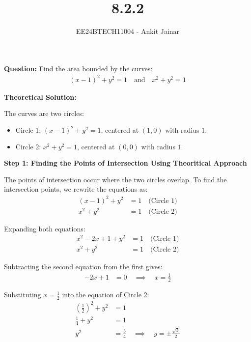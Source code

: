\documentclass[journal]{IEEEtran}
\title{8.2.2}
\author{EE24BTECH11004 - Ankit Jainar}
\date{}
\begin{document}

\vspace{3cm}

\maketitle

\bigskip

\textbf{Question:}
Find the area bounded by the curves:
\begin{align}
    (x - 1)^2 + y^2 = 1 \quad \text{and} \quad x^2 + y^2 = 1
\end{align}
\newline

\textbf{Theoretical Solution:}

The curves are two circles:
\begin{itemize}
    \item Circle 1: $(x - 1)^2 + y^2 = 1$, centered at $(1, 0)$ with radius $1$.
    \item Circle 2: $x^2 + y^2 = 1$, centered at $(0, 0)$ with radius $1$.
\end{itemize}

\textbf{Step 1: Finding the Points of Intersection Using Theoritical Approach}

The points of intersection occur where the two circles overlap. To find the intersection points, we rewrite the equations as:
\begin{align}
    (x - 1)^2 + y^2 &= 1 \quad \text{(Circle 1)} \\
    x^2 + y^2 &= 1 \quad \text{(Circle 2)}
\end{align}

Expanding both equations:
\begin{align}
    x^2 - 2x + 1 + y^2 &= 1 \quad \text{(Circle 1)} \\
    x^2 + y^2 &= 1 \quad \text{(Circle 2)}
\end{align}

Subtracting the second equation from the first gives:
\begin{align}
    -2x + 1 &= 0 \quad \implies \quad x = \frac{1}{2}
\end{align}

Substituting $x = \frac{1}{2}$ into the equation of Circle 2:
\begin{align}
    \left(\frac{1}{2}\right)^2 + y^2 &= 1 \\
    \frac{1}{4} + y^2 &= 1 \\
    y^2 &= \frac{3}{4} \quad \implies \quad y = \pm \frac{\sqrt{3}}{2}
\end{align}
\end{document}
